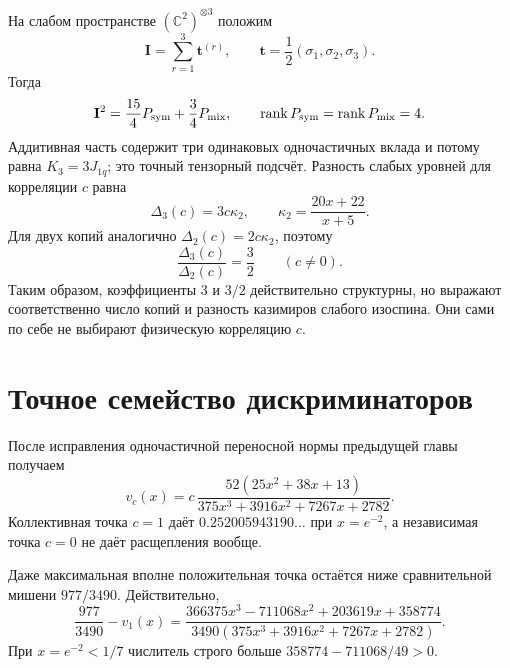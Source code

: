 На слабом пространстве $(\mathbb C^2)^{\otimes3}$ положим
\begin{equation}
 \mathbf I=\sum_{r=1}^{3}\mathbf t^{(r)},
 \qquad
 \mathbf t=\frac12(\sigma_1,\sigma_2,\sigma_3).
 \label{eq:v8-baryon-total-isospin}
\end{equation}
Тогда
\begin{equation}
 \mathbf I^2=\frac{15}{4}P_{\rm sym}+\frac34P_{\rm mix},
 \qquad
 \operatorname{rank} P_{\rm sym}=\operatorname{rank} P_{\rm mix}=4.
 \label{eq:v8-baryon-isospin-projectors}
\end{equation}
Аддитивная часть содержит три одинаковых одночастичных вклада и потому
равна $K_3=3J_{1q}$; это точный тензорный подсчёт. Разность слабых уровней
для корреляции $c$ равна
\begin{equation}
 \Delta_3(c)=3c\kappa_2,
 \qquad
 \kappa_2=\frac{20x+22}{x+5}.
 \label{eq:v8-baryon-three-copy-splitting}
\end{equation}
Для двух копий аналогично $\Delta_2(c)=2c\kappa_2$, поэтому
\begin{equation}
 \frac{\Delta_3(c)}{\Delta_2(c)}=\frac32
 \qquad(c\ne0).
 \label{eq:v8-baryon-three-over-two-ratio}
\end{equation}
Таким образом, коэффициенты $3$ и $3/2$ действительно структурны, но
выражают соответственно число копий и разность казимиров слабого изоспина.
Они сами по себе не выбирают физическую корреляцию $c$.

\section{Точное семейство дискриминаторов}

После исправления одночастичной переносной нормы предыдущей главы
получаем
\begin{equation}
 v_c(x)=c\,
 \frac{52(25x^2+38x+13)}
 {375x^3+3916x^2+7267x+2782}.
 \label{eq:v8-baryon-correlation-family-discriminator}
\end{equation}
Коллективная точка $c=1$ даёт $0.252005943190\ldots$ при $x=e^{-2}$,
а независимая точка $c=0$ не даёт расщепления вообще.

Даже максимальная вполне положительная точка остаётся ниже сравнительной
мишени $977/3490$. Действительно,
\begin{equation}
 \frac{977}{3490}-v_1(x)
 =\frac{366375x^3-711068x^2+203619x+358774}
 {3490(375x^3+3916x^2+7267x+2782)}.
 \label{eq:v8-baryon-cp-cone-target-gap}
\end{equation}
При $x=e^{-2}<1/7$ числитель строго больше
$358774-711068/49>0$.

